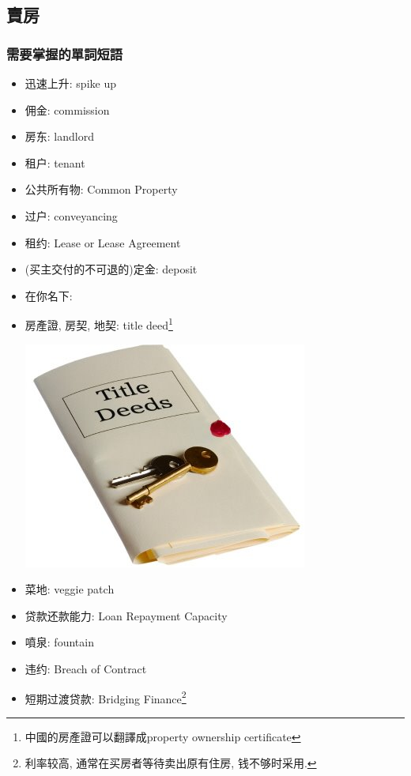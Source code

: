 \subsection{賣房}
\subsubsection*{需要掌握的單詞短語}
\begin{multicols}{2}
\begin{itemize}
  \itemsep0em
  \item 迅速上升: spike up
  \item 佣金: commission
  \item 房东: landlord
  \item 租户: tenant
  \item 公共所有物: Common Property
  \item 过户: conveyancing
  \item 租约: Lease or Lease Agreement
  \item (买主交付的不可退的)定金: deposit
  \item 在你名下: 
  \item 房產證, 房契, 地契: title deed\footnote{中國的房產證可以翻譯成property ownership certificate}
  \begin{center}
  	\includegraphics[scale=.45]{pics/deed}
  \end{center}
  \item 菜地: veggie patch
  \item 贷款还款能力: Loan Repayment Capacity
  \item 噴泉: fountain
  \item 违约: Breach of Contract
  \item 短期过渡贷款: Bridging Finance\footnote{利率较高, 通常在买房者等待卖出原有住房, 钱不够时采用.}
\end{itemize}
\end{multicols}

